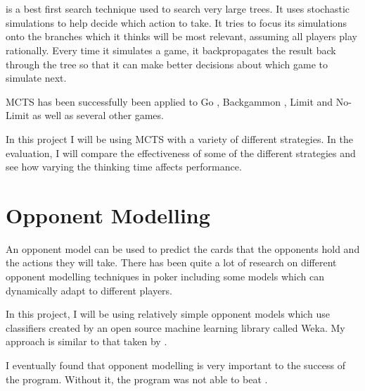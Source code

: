 


\section{\mcts}									%


\mcts is a best first search technique used to search very large trees.
It uses stochastic simulations to help decide which action to take. It tries to focus its simulations onto the branches which it thinks will be most relevant, assuming all players play rationally. Every time it simulates a game, it backpropagates the result back through the tree so that it can make better decisions about which game to simulate next.

MCTS has been successfully been applied to Go \cite{mcts-go}, Backgammon \cite{mcts-bg}, Limit and No-Limit \texas \cite{mcts-iomp} \cite{mcts-erd} as well as several other games. 

In this project I will be using MCTS with a variety of different strategies. In the evaluation, I will compare the effectiveness of some of the different strategies and see how varying the thinking time affects performance.




\section{Opponent Modelling}					%


An opponent model can be used to predict the cards that the opponents hold and the actions they will take. There has been quite a lot of research on different opponent modelling techniques in poker including some models which can dynamically adapt to different players. 

In this project, I will be using relatively simple opponent models which use classifiers created by an open source machine learning library called Weka. My approach is similar to that taken by \cite{mcts-erd}.

I eventually found that opponent modelling is very important to the success of the program. Without it, the program was not able to beat \sbt.



